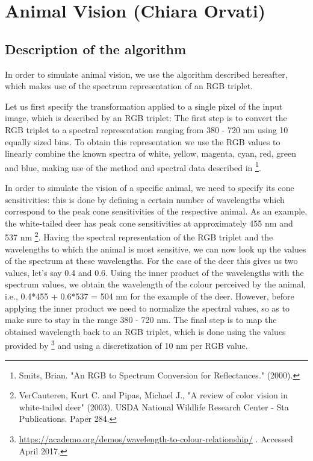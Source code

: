 \documentclass[12pt]{article}
\begin{document}
\section{Animal Vision (Chiara Orvati)}

\subsection{Description of the algorithm}

In order to simulate animal vision, we use the algorithm described hereafter, which makes use of the
spectrum representation of an RGB triplet.

\vspace{5mm}

Let us first specify the transformation applied to a single pixel of the input image, which is described by an
RGB triplet: The first step is to convert the RGB triplet to a spectral representation ranging from 380 - 720
nm using 10 equally sized bins. To obtain this representation we use the RGB values to linearly combine the
known spectra of white, yellow, magenta, cyan, red, green and blue, making use of the method and
spectral data described in \footnote{Smits, Brian. "An RGB to Spectrum Conversion for Reflectances." (2000).}.

In order to simulate the vision of a specific animal, we need to specify its cone sensitivities: this is done by
defining a certain number of wavelengths which correspond to the peak cone sensitivities of the respective
animal. As an example, the white-tailed deer has peak cone sensitivities at approximately 455 nm and 537
nm \footnote{VerCauteren, Kurt C. and Pipas, Michael J., "A review of color vision in white-tailed deer" (2003). USDA
National Wildlife Research Center - Sta Publications. Paper 284.}. Having the spectral representation of the RGB triplet and the wavelengths to which the animal is most
sensitive, we can now look up the values of the spectrum at these wavelengths. For the case of the deer
this gives us two values, let’s say 0.4 and 0.6. Using the inner product of the wavelengths with the spectrum
values, we obtain the wavelength of the colour perceived by the animal, i.e., 0.4*455 + 0.6*537 = 504 nm for
the example of the deer. However, before applying the inner product we need to normalize the spectral
values, so as to make sure to stay in the range 380 - 720 nm. The final step is to map the obtained
wavelength back to an RGB triplet, which is done using the values provided by \footnote{\url{https://academo.org/demos/wavelength-to-colour-relationship/} . Accessed April 2017.} and using a discretization
of 10 nm per RGB value.
\end{document}
